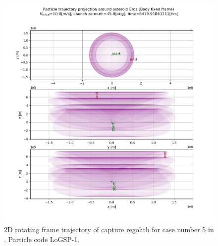 \documentclass[print]{tudelft-report}
\begin{document}
\begin{appendices}
\begin{figure}[htb]
    \includegraphics[width=\textwidth, height=\textheight]{Results/Images/longest_edge_perturbations/3.2Density_1cmSize/2dTrajectory_10ms_45Azimuth_315solarPhase_bodyFrame.png}
    \caption{2D rotating frame trajectory of capture regolith for case number 5 in . Particle code LoGSP-1.}
    \label{fig:LoGSP_1_capture_case_5_2d_traj_bodyFrame}
    \end{figure}
    \FloatBarrier
\end{appendices}
\end{document}

